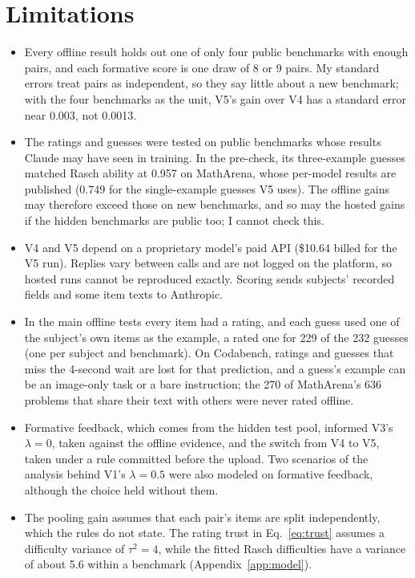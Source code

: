 \section{Limitations}\label{sec:limitations}

\begin{itemize}
  \item Every offline result holds out one of only four public benchmarks with enough pairs, and each formative score is one draw of 8 or 9 pairs. My standard errors treat pairs as independent, so they say little about a new benchmark; with the four benchmarks as the unit, V5's gain over V4 has a standard error near 0.003, not 0.0013.
  \item The ratings and guesses were tested on public benchmarks whose results Claude may have seen in training. In the pre-check, its three-example guesses matched Rasch ability at 0.957 on MathArena, whose per-model results are published (0.749 for the single-example guesses V5 uses). The offline gains may therefore exceed those on new benchmarks, and so may the hosted gains if the hidden benchmarks are public too; I cannot check this.
  \item V4 and V5 depend on a proprietary model's paid API (\$10.64 billed for the V5 run). Replies vary between calls and are not logged on the platform, so hosted runs cannot be reproduced exactly. Scoring sends subjects' recorded fields and some item texts to Anthropic.
  \item In the main offline tests every item had a rating, and each guess used one of the subject's own items as the example, a rated one for 229 of the 232 guesses (one per subject and benchmark). On Codabench, ratings and guesses that miss the 4-second wait are lost for that prediction, and a guess's example can be an image-only task or a bare instruction; the 270 of MathArena's 636 problems that share their text with others were never rated offline.
  \item Formative feedback, which comes from the hidden test pool, informed V3's $\lambda = 0$, taken against the offline evidence, and the switch from V4 to V5, taken under a rule committed before the upload. Two scenarios of the analysis behind V1's $\lambda = 0.5$ were also modeled on formative feedback, although the choice held without them.
  \item The pooling gain assumes that each pair's items are split independently, which the rules do not state. The rating trust in Eq.~\eqref{eq:trust} assumes a difficulty variance of $\tau^2 = 4$, while the fitted Rasch difficulties have a variance of about 5.6 within a benchmark (Appendix~\ref{app:model}).
\end{itemize}

